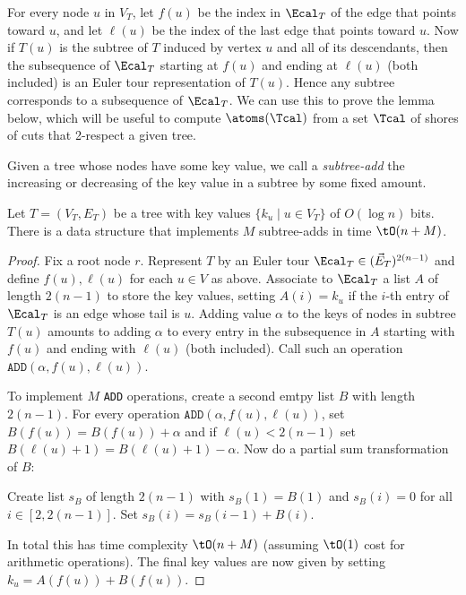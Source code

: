 For every node $u$ in $V_T$, let $f(u)$ be the index in $\Ecal_T$ of the edge that points toward $u$, and let $\ell(u)$ be the index of the last edge that points toward $u$.
Now if $T(u)$ is the subtree of $T$ induced by vertex $u$ and all of its descendants, then the subsequence of $\Ecal_T$ starting at $f(u)$ and ending at $\ell(u)$ (both included) is an Euler tour representation of $T(u)$.
Hence any subtree corresponds to a subsequence of $\Ecal_T$.
We can use this to prove the lemma below, which will be useful to compute $\atoms(\Tcal)$ from a set $\Tcal$ of shores of cuts that 2-respect a given tree.

Given a tree whose nodes have some key value, we call a \emph{subtree-add} the increasing or decreasing of the key value in a subtree by some fixed amount.

\begin{lemma} \label{lem:euler-tree}
Let $T=(V_T,E_T)$ be a tree with key values $\{k_u \mid u \in V_T\}$ of $O(\log n)$ bits.
There is a data structure that implements $M$ subtree-adds in time $\tO(n + M)$.
\end{lemma}
\begin{proof}
Fix a root node $r$.
Represent $T$ by an Euler tour $\Ecal_T \in (\vec E_T)^{2(n-1)}$ and define $f(u),\ell(u)$ for each $u \in V$ as above.
Associate to $\Ecal_T$ a list $A$ of length $2(n-1)$ to store the key values, setting $A(i) = k_u$ if the $i$-th entry of $\Ecal_T$ is an edge whose tail is $u$.
Adding value $\alpha$ to the keys of nodes in subtree $T(u)$ amounts to adding $\alpha$ to every entry in the subsequence in $A$ starting with $f(u)$ and ending with $\ell(u)$ (both included).
Call such an operation $\texttt{ADD}(\alpha,f(u),\ell(u))$.

To implement $M$ \texttt{ADD} operations, create a second emtpy list $B$ with length $2(n-1)$.
For every operation $\texttt{ADD}(\alpha,f(u),\ell(u))$, set $B(f(u)) = B(f(u)) + \alpha$ and if $\ell(u) < 2(n-1)$ set $B(\ell(u)+1) = B(\ell(u)+1) - \alpha$.
Now do a partial sum transformation of $B$:
\begin{algorithmic}[1]
\State
Create list $s_B$ of length $2(n-1)$ with $s_B(1) = B(1)$ and $s_B(i) = 0$ for all $i \in [2,2(n-1)]$.
\State
Set $s_B(i) = s_B(i-1) + B(i)$.
\EndFor
\end{algorithmic}
In total this has time complexity $\tO(n + M)$ (assuming $\tO(1)$ cost for arithmetic operations).
The final key values are now given by setting $k_u = A(f(u)) + B(f(u))$.
\end{proof}

